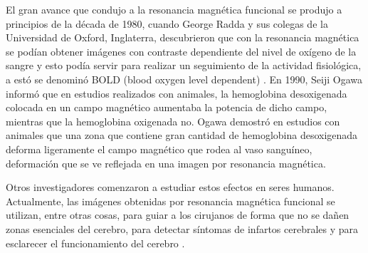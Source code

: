 El gran avance que condujo a la resonancia magnética funcional se produjo a principios de la década de 1980, cuando George Radda y sus colegas de la Universidad de Oxford, Inglaterra, descubrieron que con la resonancia magnética se podían obtener imágenes con contraste dependiente del nivel de oxígeno de la sangre y esto podía servir para realizar un seguimiento de la actividad fisiológica,  a estó se denominó BOLD (blood oxygen level dependent) \cite{Maestu_2008}. En 1990, Seiji Ogawa informó que en estudios realizados con animales, la hemoglobina desoxigenada colocada en un campo magnético aumentaba la potencia de dicho campo, mientras que la hemoglobina oxigenada no. Ogawa demostró en estudios con animales que una zona que contiene gran cantidad de hemoglobina desoxigenada deforma ligeramente el campo magnético que rodea al vaso sanguíneo, deformación que se ve reflejada en una imagen por resonancia magnética.

Otros investigadores comenzaron a estudiar estos efectos en seres humanos. Actualmente, las imágenes obtenidas por resonancia magnética funcional se utilizan, entre otras cosas, para guiar a los cirujanos de forma que no se dañen zonas esenciales del cerebro, para detectar síntomas de infartos cerebrales y para esclarecer el funcionamiento del cerebro \cite{Maestu_2008}.

